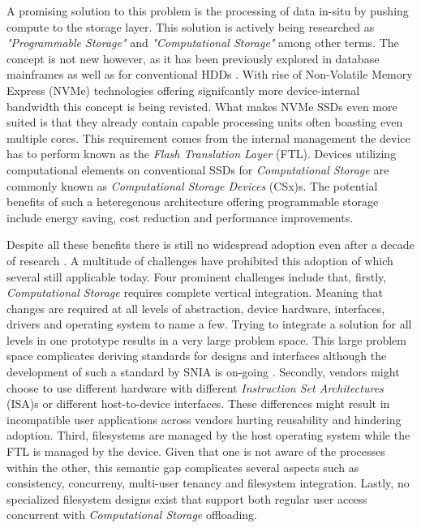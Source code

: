 A promising solution to this problem is the processing of data in-situ by
pushing compute to the storage layer. This solution is actively being researched
as \textit{"Programmable Storage"} and \textit{"Computational Storage"} among
other terms. The concept is not new however, as it has been previously
explored in database mainframes \cite{database-computer} as well as for
conventional HDDs \cite{active-disk-pillar, active-disks-tech,
intelligent-disk}. With rise of Non-Volatile Memory Express (NVMe) technologies
offering signifcantly more device-internal bandwidth this concept is being
revisted. What makes NVMe SSDs even more suited is that they already contain
capable processing units often boasting even multiple cores. This requirement
comes from the internal management the device has to perform known as the
\textit{Flash Translation Layer} (FTL). Devices utilizing computational elements
on conventional SSDs for \textit{Computational Storage} are commonly known as
\textit{Computational Storage Devices} (CSx)s. The potential benefits of such a
heteregenous architecture offering programmable storage include energy saving,
cost reduction and performance improvements.


Despite all these benefits there is still no widespread adoption even after a
decade of research \cite{lukken2021past}. A multitude of challenges
have prohibited this adoption of which several still applicable today. Four
prominent challenges include that, firstly, \textit{Computational Storage}
requires complete vertical integration. Meaning that changes are required at all
levels of abstraction, device hardware, interfaces, drivers and operating system
to name a few. Trying to integrate a solution for all levels in one prototype
results in a very large problem space. This large problem space complicates
deriving standards for designs and interfaces although the development of such a
standard by SNIA is on-going \cite{snia-model}. Secondly, vendors might choose
to use different hardware with different
\textit{Instruction Set Architectures} (ISA)s or different host-to-device
interfaces. These differences might result in incompatible user applications
across vendors hurting reusability and hindering adoption. Third, filesystems
are managed by the host operating system while the FTL is
managed by the device. Given that one is not aware of the processes within the
other, this semantic gap complicates several aspects such as consistency,
concurreny, multi-user tenancy and filesystem integration. Lastly, no
specialized filesystem designs exist that support both regular user access
concurrent with \textit{Computational Storage} offloading.

